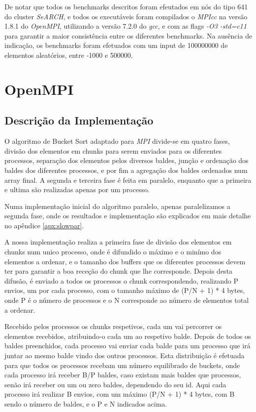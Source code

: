 \documentclass[a4paper]{report}
\begin{document}
De notar que todos os benchmarks descritos foram efeutados em nós do tipo 641 do
cluster \textit{SeARCH}, e todos os executáveis foram compilados o
\textit{MPIcc} na versão 1.8.1 do \textit{OpenMPI}, utilizando a versão
7.2.0 do \textit{gcc}, e com as flags \textit{-O3 -std=c11} para garantir 
a maior consistência entre os diferentes benchmarks. Na
ausência de indicação, os benchmarks foram efetuados com um input de 100000000
de elementos aleatórios, entre -1000 e 500000.

\chapter{OpenMPI} \label{chap:ompi}

\section{Descrição da Implementação}
O algoritmo de Bucket Sort adaptado para \textit{MPI} divide-se em quatro fases,
divisão dos elementos em chunks para serem enviados para os diferentes
processos, separação dos elementos pelos diversos baldes, junção e ordenação dos
baldes dos diferentes processos, e por fim a agregação dos baldes ordenados num
array final. A segunda e terceira fase é feita em paralelo, enquanto que a
primeira e ultima são realizadas apenas por um processo.

Numa implementação inicial do algoritmo paralelo, apenas paralelizamos a
segunda fase, onde os resultados e implementação são explicados em mais detalhe
no apêndice \ref{apx:slowpar}.

A nossa implementação realiza a primeira fase de divisão dos elementos em chunks
num unico processo, onde é difundido o máximo e o minímo dos elementos a
ordenar, e o tamanho dos buffers que os diferentes processos devem ter para
garantir a boa receção do chunk que lhe corresponde. Depois desta difusão, é
enviado a todos os processos o chunk correspondendo, realizando P envios, um por
cada processo, com o tamanho máximo de (P/N + 1) * 4 bytes, onde P é o número de
processos e o N corresponde ao número de elementos total a ordenar.

Recebido pelos processos os chunks respetivos, cada um vai percorrer os
elementos recebidos, atribuindo-o cada um ao respetivo balde. Depois de todos os
baldes preenchidos, cada processo vai enviar cada balde para um processo que
irá juntar ao mesmo balde vindo dos outros processos. Esta distribuição é
efetuada para que todos os processos recebam um número equilibrado de
buckets, onde cada processo irá receber B/P baldes, caso existam mais baldes
que processos, senão irá receber ou um ou zero baldes, dependendo do seu id. 
Aqui cada processo irá realizar B envios, com um máximo (P/N + 1) * 4 bytes, 
com B sendo o número de baldes, e o P e N indicados acima.
\end{document}
